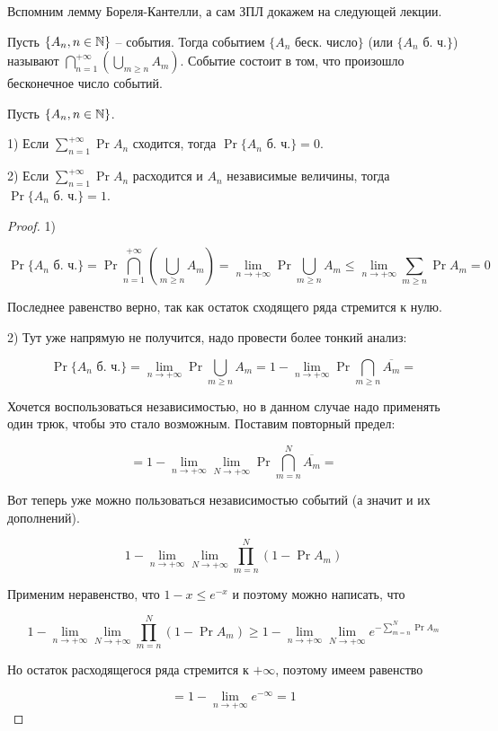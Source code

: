 Вспомним лемму Бореля-Кантелли, а сам ЗПЛ докажем на следующей лекции.

\begin{definition}
  Пусть $\{A_n, n \in \mathbb{N}\}$ -- события. Тогда событием $\{A_n \text{ беск. число}\}$
  (или $\{A_n \text{ б. ч.}\}$)
  называют $\bigcap\limits_{n = 1}^{+\infty}\left(\bigcup\limits_{m \geq n} A_m\right)$. Событие
  состоит в том, что произошло бесконечное число событий.
\end{definition}

\begin{theorem}
  Пусть $\{A_n, n \in \mathbb{N}\}$. 

  1) Если $\sum\limits_{n = 1}^{+\infty} \Pr{A_n}$ сходится,
  тогда $\Pr{\{A_n \text{ б. ч.}\}} = 0$.

  2) Если $\sum\limits_{n = 1}^{+\infty} \Pr{A_n}$ расходится и $A_n$ независимые
  величины,
  тогда $\Pr{\{A_n \text{ б. ч.}\}} = 1$.
\end{theorem}

\begin{proof}
  1)

  \[
    \Pr{\{A_n \text{ б. ч.}\}} = \Pr{\bigcap\limits_{n = 1}^{+\infty}\left(\bigcup\limits_{m \geq n} A_m\right)} =
    \lim\limits_{n \to +\infty} \Pr{\bigcup\limits_{m \geq n} A_m} \leq
    \lim\limits_{n \to +\infty} \sum\limits_{m \geq n} \Pr{A_m} = 0
  \]

  Последнее равенство верно, так как остаток сходящего ряда стремится к нулю.

  2) Тут уже напрямую не получится, надо провести более тонкий анализ:

  \[
     \Pr{\{A_n \text{ б. ч.}\}} =  \lim\limits_{n \to +\infty} 
     \Pr{\bigcup\limits_{m \geq n} A_m} = 1 - \lim\limits_{n \to +\infty}
     \Pr{\bigcap\limits_{m \geq n} \overline{A_m}} = 
  \]

  Хочется воспользоваться независимостью, но в данном случае надо применять один
  трюк, чтобы это стало возможным. Поставим повторный предел:

  \[
    =  1 - \lim\limits_{n \to +\infty}\lim\limits_{N \to +\infty} \Pr{\bigcap\limits_{m = n}^{N} \overline{A_m}} = 
  \]

  Вот теперь уже можно пользоваться независимостью событий (а значит и их
  дополнений).

  \[
    1 - \lim\limits_{n \to +\infty}\lim\limits_{N \to +\infty} \prod_{m = n}^{N}(1 -
    \Pr{A_m}) 
  \]

  Применим неравенство, что $1 - x \leqslant e^{-x}$ и поэтому можно написать, что

  \[
    1 - \lim\limits_{n \to +\infty}\lim\limits_{N \to +\infty} \prod_{m = n}^{N}(1 -
    \Pr{A_m}) \geq 1 - \lim\limits_{n \to +\infty}\lim\limits_{N \to +\infty}
    e^{-\sum\limits_{m = n}^{N} \Pr{A_m}}
  \]

  Но остаток расходящегося ряда стремится к $+\infty$, поэтому имеем равенство

  \[
    = 1 - \lim\limits_{n \to +\infty}e^{-\infty} = 1
  \]
\end{proof}
